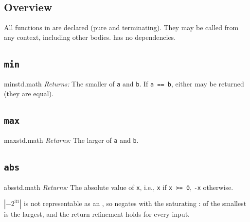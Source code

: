 \subsection{Overview}
\label{sec:stdlib.math.overview}

\pnum
All functions in  are declared  (pure and
terminating).  They may be called from any context, including other
 bodies.   has no dependencies.

\subsection{\texttt{min}}
\label{sec:stdlib.math.min}

\begin{functionspec}{min}{std.math}
\noindent\textit{Returns:} The smaller of \texttt{a} and \texttt{b}.
If \texttt{a == b}, either may be returned (they are equal).
\end{functionspec}

\subsection{\texttt{max}}
\label{sec:stdlib.math.max}

\begin{functionspec}{max}{std.math}
\noindent\textit{Returns:} The larger of \texttt{a} and \texttt{b}.
\end{functionspec}

\subsection{\texttt{abs}}
\label{sec:stdlib.math.abs}

\begin{functionspec}{abs}{std.math}
\noindent\textit{Returns:} The absolute value of \texttt{x},
i.e., \texttt{x} if \texttt{x >= 0}, \texttt{-x} otherwise.
\end{functionspec}

\begin{note}
  $|{-2^{31}}|$ is not representable as an , so  negates with the
  saturating \lain{-|}:  of the smallest  is the largest, and the
  return refinement  holds for every input.
\end{note}

